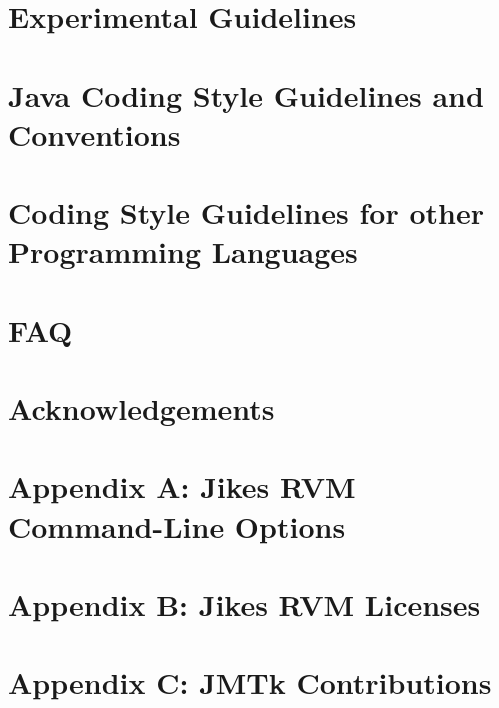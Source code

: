 \documentclass{article}
\begin{document}
\T \newpage
{}
\section{Experimental Guidelines}


\T \newpage
{}
\section{Java Coding Style Guidelines and Conventions}
\label{section:javacodingstyle}


\T \newpage
{}
\section{Coding Style Guidelines for other Programming Languages}
\label{section:codingstyle-nonjava}


\T \newpage
{}
\section{FAQ}


\T \newpage
\section*{Acknowledgements}


\T \newpage
\T 
\T 

\T \newpage

\T \appendix

\section{Appendix A: Jikes RVM Command-Line Options}
\label{appendix:nonadaptive:cmdline}


\T \newpage
{}
\section{Appendix B: Jikes RVM Licenses}
\label{appendix:licenses}


\T \newpage
{}
\section{Appendix C: JMTk Contributions}
\label{appendix:contributions}


\W \section*{\indexname}\label{hlxindex}
\W \htmlprintindex
\T \printindex

 \W {}
 \W 
\end{document}
